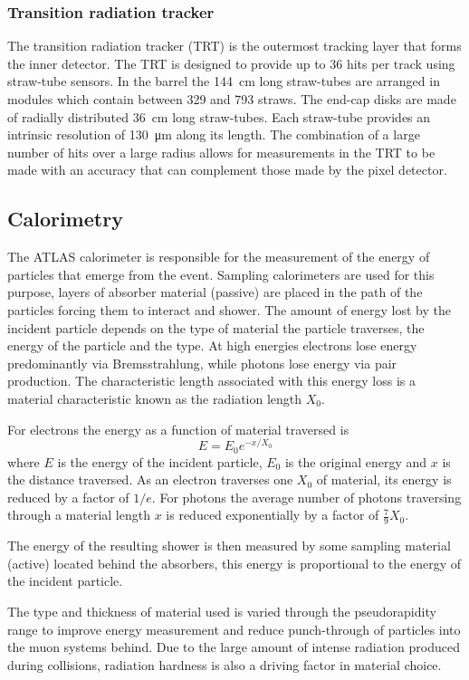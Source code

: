 \subsubsection{Transition radiation tracker}
The transition radiation tracker (TRT) is the outermost tracking layer that forms the inner detector. The TRT is designed to provide up to 36 hits per track using straw-tube sensors. In the barrel the \SI{144}{\cm} long straw-tubes are arranged in modules which contain between 329 and 793 straws. The end-cap disks are made of radially distributed \SI{36}{\cm} long straw-tubes. Each straw-tube provides an intrinsic resolution of \SI{130}{\um} along its length. The combination of a large number of hits over a large radius allows for measurements in the TRT to be made with an accuracy that can complement those made by the pixel detector.

\subsection{Calorimetry}
The ATLAS calorimeter is responsible for the measurement of the energy of particles that emerge from the event. Sampling calorimeters are used for this purpose, layers of absorber material (passive) are placed in the path of the particles forcing them to interact and shower. The amount of energy lost by the incident particle depends on the type of material the particle traverses, the energy of the particle and the type. At high energies electrons lose energy predominantly via Bremsstrahlung, while photons lose energy via pair production. The characteristic length associated with this energy loss is a material characteristic known as the radiation length $X_0$.

For electrons the energy as a function of material traversed is 
%
\begin{equation}
  E=E_0e^{-x/X_0}
\end{equation}
%
where $E$ is the energy of the incident particle, $E_0$ is the original energy and $x$ is the distance traversed. As an electron traverses one $X_0$ of material, its energy is reduced by a factor of $1/e$. For photons the average number of photons traversing through a material length $x$ is reduced exponentially by a factor of $\frac{7}{9}X_0$.

The energy of the resulting shower is then measured by some sampling material (active) located behind the absorbers, this energy is proportional to the energy of the incident particle.

The type and thickness of material used is varied through the pseudorapidity range to improve energy measurement and reduce punch-through of particles into the muon systems behind. Due to the large amount of intense radiation produced during collisions, radiation hardness is also a driving factor in material choice.

